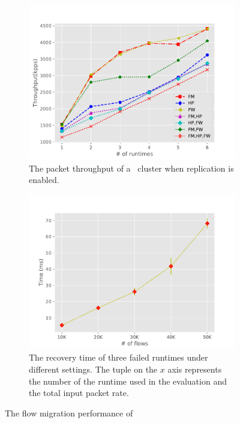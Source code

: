  \begin{figure}[!t]
 \begin{subfigure}[t]{0.49\linewidth}
		\centering
		\includegraphics[width=\columnwidth]{figure/ReplicaTP.pdf}
		\caption{The packet throughput of a \nfactor~cluster when replication is enabled. }\label{fig:rep-scale}
	 \end{subfigure}\hfill
	 \begin{subfigure}[t]{0.49\linewidth}
	\centering
		\includegraphics[width=\columnwidth]{figure/Recover.pdf}
		\caption{The recovery time of three failed runtimes under different settings. The tuple on the $x$ axis represents the number of the runtime used in the evaluation and the total input packet rate. }\label{fig:rep-recovery} \end{subfigure}
	\caption{The flow migration performance of \nfactor}
\label{fig:rep-perf}
\end{figure}

